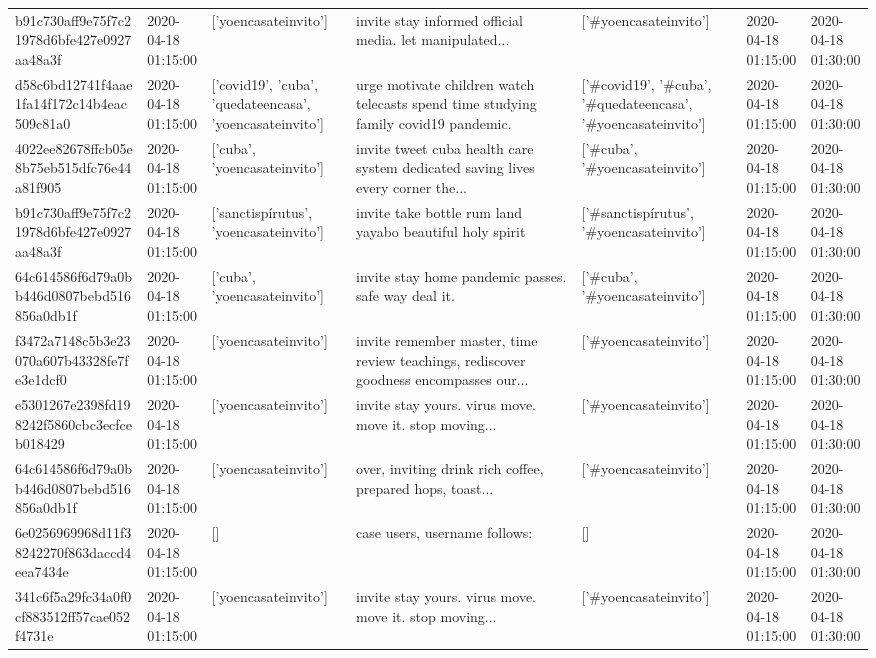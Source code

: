 \begin{tabular}{lllllll}
b91c730aff9e75f7c21978d6bfe427e0927aa48a3f & 2020-04-18 01:15:00 & ['yoencasateinvito'] & invite stay informed official media. let manipulated... & ['#yoencasateinvito'] & 2020-04-18 01:15:00 & 2020-04-18 01:30:00 \\
d58c6bd12741f4aae1fa14f172c14b4eac509c81a0 & 2020-04-18 01:15:00 & ['covid19', 'cuba', 'quedateencasa', 'yoencasateinvito'] & urge motivate children watch telecasts spend time studying family covid19 pandemic. & ['#covid19', '#cuba', '#quedateencasa', '#yoencasateinvito'] & 2020-04-18 01:15:00 & 2020-04-18 01:30:00 \\
4022ee82678ffcb05e8b75eb515dfc76e44a81f905 & 2020-04-18 01:15:00 & ['cuba', 'yoencasateinvito'] & invite tweet cuba health care system dedicated saving lives every corner the... & ['#cuba', '#yoencasateinvito'] & 2020-04-18 01:15:00 & 2020-04-18 01:30:00 \\
b91c730aff9e75f7c21978d6bfe427e0927aa48a3f & 2020-04-18 01:15:00 & ['sanctispírutus', 'yoencasateinvito'] & invite take bottle rum land yayabo beautiful holy spirit & ['#sanctispírutus', '#yoencasateinvito'] & 2020-04-18 01:15:00 & 2020-04-18 01:30:00 \\
64c614586f6d79a0bb446d0807bebd516856a0db1f & 2020-04-18 01:15:00 & ['cuba', 'yoencasateinvito'] & invite stay home pandemic passes. safe way deal it. & ['#cuba', '#yoencasateinvito'] & 2020-04-18 01:15:00 & 2020-04-18 01:30:00 \\
f3472a7148c5b3e23070a607b43328fe7fe3e1dcf0 & 2020-04-18 01:15:00 & ['yoencasateinvito'] & invite remember master, time review teachings, rediscover goodness encompasses our... & ['#yoencasateinvito'] & 2020-04-18 01:15:00 & 2020-04-18 01:30:00 \\
e5301267e2398fd198242f5860cbc3ecfceb018429 & 2020-04-18 01:15:00 & ['yoencasateinvito'] & invite stay yours. virus move. move it. stop moving... & ['#yoencasateinvito'] & 2020-04-18 01:15:00 & 2020-04-18 01:30:00 \\
64c614586f6d79a0bb446d0807bebd516856a0db1f & 2020-04-18 01:15:00 & ['yoencasateinvito'] & over, inviting drink rich coffee, prepared hops, toast... & ['#yoencasateinvito'] & 2020-04-18 01:15:00 & 2020-04-18 01:30:00 \\
6e0256969968d11f38242270f863daccd4eea7434e & 2020-04-18 01:15:00 & [] & case users, username follows: & [] & 2020-04-18 01:15:00 & 2020-04-18 01:30:00 \\
341c6f5a29fc34a0f0cf883512ff57cae052f4731e & 2020-04-18 01:15:00 & ['yoencasateinvito'] & invite stay yours. virus move. move it. stop moving... & ['#yoencasateinvito'] & 2020-04-18 01:15:00 & 2020-04-18 01:30:00 \\

\end{tabular}
